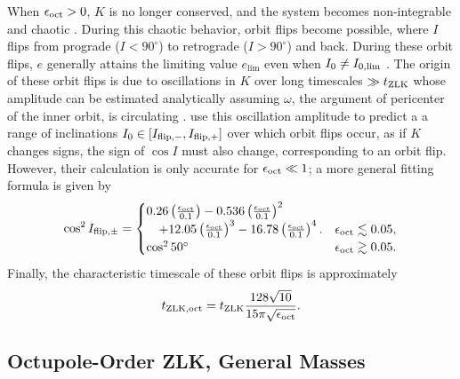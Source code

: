 \documentclass[
        fleqn,
        usenatbib,
    ]{mnras}
\newcommand*{\p}[1]{\left(#1\right)}
\newcommand*{\s}[1]{\left[#1\right]}
\begin{document}
When $\epsilon_{\rm oct} > 0$, $K$ is no longer conserved, and the system
becomes non-integrable and chaotic \citep{ford2000secular, katz2011long,
lithwick2011eccentric}. During this chaotic behavior, orbit flips become
possible, where $I$ flips from prograde ($I < 90^\circ$) to retrograde ($I >
90^\circ$) and back. During these orbit flips, $e$ generally attains the
limiting value $e_{\lim}$ even when $I_{\rm 0} \neq I_{\rm 0, \lim}$
\citep{lithwick2011eccentric, LML15}. The origin of these orbit flips is due to
oscillations in $K$ over long timescales $\gg t_{\rm ZLK}$ whose amplitude can
be estimated analytically assuming $\omega$, the argument of pericenter of the
inner orbit, is circulating \citep{katz2011long}. \citet{katz2011long} use this
oscillation amplitude to predict a a range of inclinations $I_0 \in \s{I_{\rm
flip, -}, I_{\rm flip, +}}$ over which orbit flips occur, as if $K$ changes
signs, the sign of $\cos I$ must also change, corresponding to an orbit flip.
However, their calculation is only accurate for $\epsilon_{\rm oct} \ll 1$; a
more general fitting formula is given by \citep{MLL16}
\begin{equation}
    \cos^2 I_{\rm flip, \pm} = \begin{cases}
        0.26\p{\frac{\epsilon_{\rm oct}}{0.1}}
            - 0.536\p{\frac{\epsilon_{\rm oct}}{0.1}}^2\\
            \quad + 12.05\p{\frac{\epsilon_{\rm oct}}{0.1}}^3
            - 16.78\p{\frac{\epsilon_{\rm oct}}{0.1}}^4.
            & \epsilon_{\rm oct} \lesssim 0.05,\\
        \cos^2 50^\circ & \epsilon_{\rm oct} \gtrsim 0.05.
    \end{cases} \label{eq:I_oct_MLL}
\end{equation}
Finally, the characteristic timescale of these orbit flips is approximately
\citep{antognini2015timescales}
\begin{equation}
    t_{\rm ZLK, oct} = t_{\rm ZLK}\frac{128\sqrt{10}}{
        15\pi\sqrt{\epsilon_{\rm oct}}}.\label{eq:def_tzlkoct}
\end{equation}

\subsection{Octupole-Order ZLK, General Masses}\label{ss:oct_gen}
\end{document}
